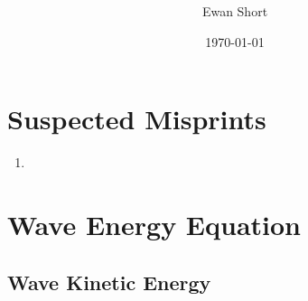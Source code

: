 \documentclass[12pt]{article}
\title{\citet{bretherton66}}
\author{Ewan Short}
\date{\today}
\begin{document}
\maketitle

\section{Suspected Misprints}
\begin{enumerate}
\item
\end{enumerate}

\section{Wave Energy Equation}

\subsection{Wave Kinetic Energy}
\end{document}
